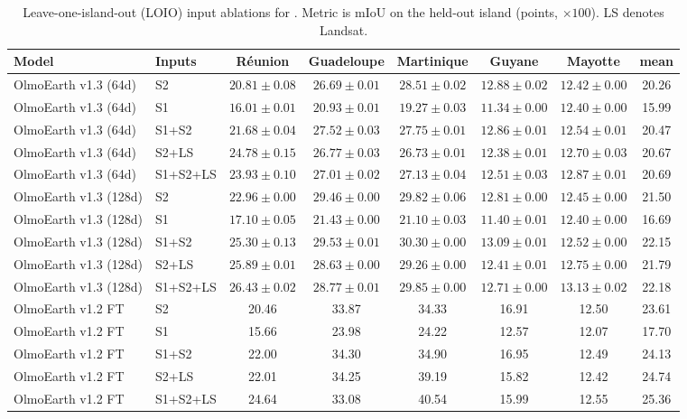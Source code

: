 \begin{table}[t]
    \centering
    \small
    \setlength{\tabcolsep}{4pt}
    \begin{tabular}{ll|ccccc|c}
        Model & Inputs & R\'eunion & Guadeloupe & Martinique & Guyane & Mayotte & mean\\
        \hline
        OlmoEarth v1.3 (64d) & S2 & $20.81\pm0.08$ & $26.69\pm0.01$ & $28.51\pm0.02$ & $12.88\pm0.02$ & $12.42\pm0.00$ & 20.26\\
        OlmoEarth v1.3 (64d) & S1 & $16.01\pm0.01$ & $20.93\pm0.01$ & $19.27\pm0.03$ & $11.34\pm0.00$ & $12.40\pm0.00$ & 15.99\\
        OlmoEarth v1.3 (64d) & S1+S2 & $21.68\pm0.04$ & $27.52\pm0.03$ & $27.75\pm0.01$ & $12.86\pm0.01$ & $12.54\pm0.01$ & 20.47\\
        OlmoEarth v1.3 (64d) & S2+LS & $24.78\pm0.15$ & $26.77\pm0.03$ & $26.73\pm0.01$ & $12.38\pm0.01$ & $12.70\pm0.03$ & 20.67\\
        OlmoEarth v1.3 (64d) & S1+S2+LS & $23.93\pm0.10$ & $27.01\pm0.02$ & $27.13\pm0.04$ & $12.51\pm0.03$ & $12.87\pm0.01$ & 20.69\\
        \hline
        OlmoEarth v1.3 (128d) & S2 & $22.96\pm0.00$ & $29.46\pm0.00$ & $29.82\pm0.06$ & $12.81\pm0.00$ & $12.45\pm0.00$ & 21.50\\
        OlmoEarth v1.3 (128d) & S1 & $17.10\pm0.05$ & $21.43\pm0.00$ & $21.10\pm0.03$ & $11.40\pm0.01$ & $12.40\pm0.00$ & 16.69\\
        OlmoEarth v1.3 (128d) & S1+S2 & $25.30\pm0.13$ & $29.53\pm0.01$ & $30.30\pm0.00$ & $13.09\pm0.01$ & $12.52\pm0.00$ & 22.15\\
        OlmoEarth v1.3 (128d) & S2+LS & $25.89\pm0.01$ & $28.63\pm0.00$ & $29.26\pm0.00$ & $12.41\pm0.01$ & $12.75\pm0.00$ & 21.79\\
        OlmoEarth v1.3 (128d) & S1+S2+LS & $26.43\pm0.02$ & $28.77\pm0.01$ & $29.85\pm0.00$ & $12.71\pm0.00$ & $13.13\pm0.02$ & 22.18\\
        \hline
        OlmoEarth v1.2 FT & S2 & 20.46 & 33.87 & 34.33 & 16.91 & 12.50 & 23.61\\
        OlmoEarth v1.2 FT & S1 & 15.66 & 23.98 & 24.22 & 12.57 & 12.07 & 17.70\\
        OlmoEarth v1.2 FT & S1+S2 & 22.00 & 34.30 & 34.90 & 16.95 & 12.49 & 24.13\\
        OlmoEarth v1.2 FT & S2+LS & 22.01 & 34.25 & 39.19 & 15.82 & 12.42 & 24.74\\
        OlmoEarth v1.2 FT & S1+S2+LS & 24.64 & 33.08 & 40.54 & 15.99 & 12.55 & 25.36\\
        \hline
    \end{tabular}
    \caption{Leave-one-island-out (LOIO) input ablations for \olmoearth. Metric is
    mIoU on the held-out island (points, $\times 100$). LS denotes Landsat.}
    \label{tab:planteur-loio-olmoearth-inputs}
\end{table}

